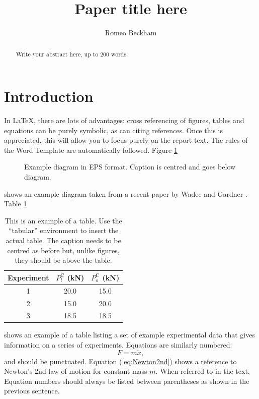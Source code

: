 \documentclass[12pt,number]{IC_fyp}
\begin{document}
\title{Paper title here}

\author{Romeo Beckham}

\address{Department of Civil and Environmental Engineering\\
  Imperial College London}

\begin{frontmatter}
  
\begin{abstract}

Write your abstract here, up to 200 words.

\end{abstract}

\end{frontmatter}

\section{Introduction}
\label{sec:intro}

In \LaTeX, there are lots of advantages: cross referencing of figures,
tables and equations can be purely symbolic, as can citing
references. Once this is appreciated, this will allow you to focus
purely on the report text. The rules of the Word Template are
automatically followed. Figure \ref{fig:example}
\begin{figure}[htbp]
	\centerline{}
  \caption{Example diagram in EPS format. Caption is centred and goes
    below diagram.}
  \label{fig:example}
\end{figure}
shows an example diagram taken from a recent paper by Wadee and Gardner
. Table \ref{tab:example}
\begin{table}[htbp]
  \begin{center}    
  \begin{tabular}{|c|c|c|}
    \hline
    Experiment & $P_l^\mathrm{C}$ (kN) & $P_o^\mathrm{C}$ (kN)\\
    \hline
    1 & 20.0 & 15.0 \\
    2 & 15.0 & 20.0 \\
    3 & 18.5 & 18.5 \\
    \hline
  \end{tabular}
  \end{center}
  \caption{This is an example of a table. Use the ``tabular''
    environment to insert the actual table. The caption needs to be
    centred as before but, unlike figures, they should be above the table.}
\label{tab:example}
\end{table}
shows an example of a table listing a set of example experimental data
that gives information on a series of experiments. Equations are
similarly numbered:
\begin{equation}
  F = m\ddot{x},
  \label{eq:Newton2nd}
\end{equation}
and should be punctuated. Equation (\ref{eq:Newton2nd}) shows a
reference to Newton's 2nd law of motion for constant mass $m$. When
referred to in the text, Equation numbers should always be listed
between parentheses as shown in the previous sentence.
\end{document}
